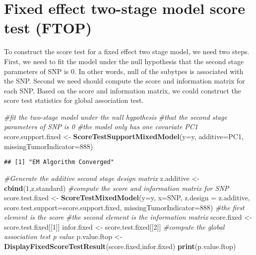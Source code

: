 \documentclass[11pt,]{article}
\newenvironment{Shaded}{\begin{snugshade}}{\end{snugshade}}
\newcommand{\KeywordTok}[1]{\textcolor[rgb]{0.13,0.29,0.53}{\textbf{#1}}}
\newcommand{\DataTypeTok}[1]{\textcolor[rgb]{0.13,0.29,0.53}{#1}}
\newcommand{\DecValTok}[1]{\textcolor[rgb]{0.00,0.00,0.81}{#1}}
\newcommand{\StringTok}[1]{\textcolor[rgb]{0.31,0.60,0.02}{#1}}
\newcommand{\CommentTok}[1]{\textcolor[rgb]{0.56,0.35,0.01}{\textit{#1}}}
\newcommand{\NormalTok}[1]{#1}
\begin{document}
\section{Fixed effect two-stage model score test
(FTOP)}\label{fixed-effect-two-stage-model-score-test-ftop}

To construct the score test for a fixed effect two stage model, we need
two steps. First, we need to fit the model under the null hypothesis
that the second stage parameters of SNP is 0. In other words, null of
the subytpes is associated with the SNP. Second we need should compute
the score and information matrix for each SNP. Based on the score and
information matrix, we could construct the score test statistics for
global association test.

\begin{Shaded}
\begin{Highlighting}[]
\CommentTok{#fit the two-stage model under the null hypothesis}
\CommentTok{#that the second stage parameters of SNP is 0}
\CommentTok{#the model only has one covariate PC1}
\NormalTok{score.support.fixed <-}\StringTok{ }\KeywordTok{ScoreTestSupportMixedModel}\NormalTok{(}\DataTypeTok{y=}\NormalTok{y,}
                                                  \DataTypeTok{additive=}\NormalTok{PC1,}
                                                  \DataTypeTok{missingTumorIndicator=}\DecValTok{888}\NormalTok{)}
\end{Highlighting}
\end{Shaded}

\begin{verbatim}
## [1] "EM Algorithm Converged"
\end{verbatim}

\begin{Shaded}
\begin{Highlighting}[]
\CommentTok{#Generate the additive second stage design matrix}
\NormalTok{z.additive <-}\StringTok{ }\KeywordTok{cbind}\NormalTok{(}\DecValTok{1}\NormalTok{,z.standard)}
\CommentTok{#compute the score and information matrix for SNP}
\NormalTok{score.test.fixed <-}\StringTok{ }\KeywordTok{ScoreTestMixedModel}\NormalTok{(}\DataTypeTok{y=}\NormalTok{y,}
                                        \DataTypeTok{x=}\NormalTok{SNP,}
                                        \DataTypeTok{z.design =}\NormalTok{ z.additive,}
                                        \DataTypeTok{score.test.support=}\NormalTok{score.support.fixed,}
                                        \DataTypeTok{missingTumorIndicator=}\DecValTok{888}\NormalTok{)}
\CommentTok{#the first element is the score}
\CommentTok{#the second element is the information matrix}
\NormalTok{score.fixed <-}\StringTok{ }\NormalTok{score.test.fixed[[}\DecValTok{1}\NormalTok{]]}
\NormalTok{infor.fixed <-}\StringTok{ }\NormalTok{score.test.fixed[[}\DecValTok{2}\NormalTok{]]}
\CommentTok{#compute the global association test p value}
\NormalTok{p.value.ftop <-}\StringTok{ }\KeywordTok{DisplayFixedScoreTestResult}\NormalTok{(score.fixed,infor.fixed) }
\KeywordTok{print}\NormalTok{(p.value.ftop)}
\end{Highlighting}
\end{Shaded}
\end{document}
